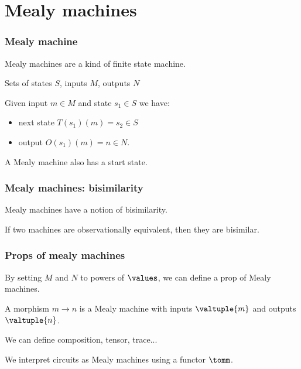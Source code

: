 \section{Mealy machines}

\begin{frame}
    \frametitle{Mealy machine}

    Mealy machines are a kind of \alert{finite state machine}.

    \pause

    Sets of \alert{states} \(S\), \pause \alert{inputs} \(M\), \pause \alert{outputs} \(N\)

    \pause

    Given input \(m \in M\) and state \(s_1 \in S\) we have:
    
    \pause

    \begin{itemize}
        \item \alert{next state} \(T(s_1)(m) = s_2 \in S\)
        \pause
        \item \alert{output} \(O(s_1)(m) = n \in N\).
    \end{itemize}

    \pause

    A Mealy machine also has a \alert{start state}.

    \pause

    \begin{center}
        
    \end{center}

\end{frame}

\begin{frame}
    \frametitle{Mealy machines: bisimilarity}

    Mealy machines have a notion of \alert{bisimilarity}.

    \pause

    If two machines are \alert{observationally equivalent}, then they are bisimilar.

\end{frame}

\begin{frame}
    \frametitle{Props of mealy machines}

    By setting \(M\) and \(N\) to powers of \(\values\), we can define a prop of Mealy machines.

    \pause

    A morphism \(m \to n\) is a Mealy machine with inputs \(\valtuple{m}\) and outputs \(\valtuple{n}\).
    
    \pause

    We can define composition, tensor, trace...

    \pause

    We interpret circuits as Mealy machines using a functor \(\tomm\).

\end{frame}


